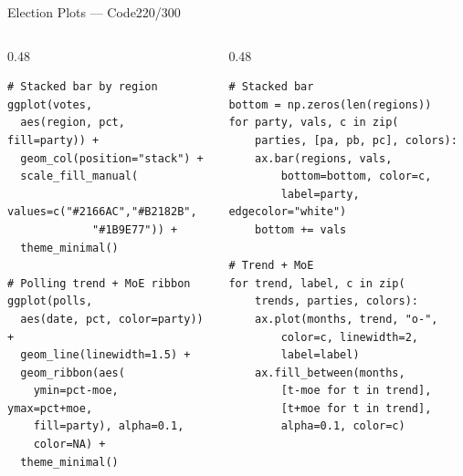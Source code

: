 \documentclass[10pt]{beamer}
\newcommand{\smark}[1]{\hfill{\scriptsize\color{codegray}#1}}
\begin{document}
\begin{frame}[fragile]{Election Plots --- Code}\smark{220/300}
\begin{columns}[T]
\begin{column}{0.48\textwidth}
\begin{lstlisting}[style=Rstyle]
# Stacked bar by region
ggplot(votes,
  aes(region, pct, fill=party)) +
  geom_col(position="stack") +
  scale_fill_manual(
    values=c("#2166AC","#B2182B",
             "#1B9E77")) +
  theme_minimal()

# Polling trend + MoE ribbon
ggplot(polls,
  aes(date, pct, color=party)) +
  geom_line(linewidth=1.5) +
  geom_ribbon(aes(
    ymin=pct-moe, ymax=pct+moe,
    fill=party), alpha=0.1,
    color=NA) +
  theme_minimal()
\end{lstlisting}
\end{column}
\begin{column}{0.48\textwidth}
\begin{lstlisting}[style=Pystyle]
# Stacked bar
bottom = np.zeros(len(regions))
for party, vals, c in zip(
    parties, [pa, pb, pc], colors):
    ax.bar(regions, vals,
        bottom=bottom, color=c,
        label=party, edgecolor="white")
    bottom += vals

# Trend + MoE
for trend, label, c in zip(
    trends, parties, colors):
    ax.plot(months, trend, "o-",
        color=c, linewidth=2,
        label=label)
    ax.fill_between(months,
        [t-moe for t in trend],
        [t+moe for t in trend],
        alpha=0.1, color=c)
\end{lstlisting}
\end{column}
\end{columns}
\end{frame}
\end{document}
